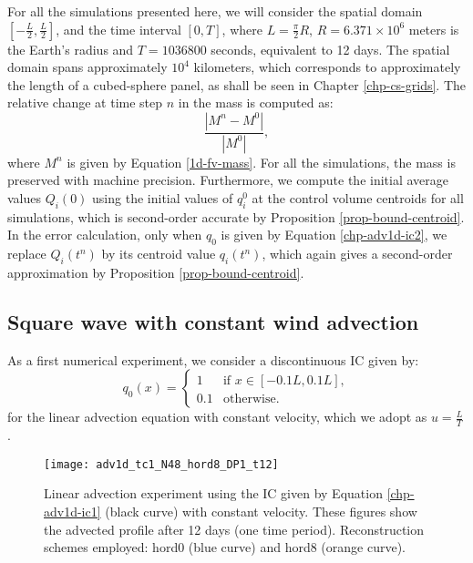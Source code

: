 For all the simulations presented here, we will consider the spatial domain $[-\frac{L}{2},\frac{L}{2}]$,
and the time interval $[0,T]$,  where $L = \frac{\pi}{2} R$, $R = 6.371 \times 10^{6}$ meters is the Earth's radius and
$T = 1036800$ seconds, equivalent to 12 days.
The spatial domain spans approximately $10^4$ kilometers, which corresponds to approximately the length of a cubed-sphere panel,
as shall be seen in Chapter \ref{chp-cs-grids}.
The relative change at time step $n$ in the mass is computed as:
\begin{equation*}
	\frac{|M^n-M^0|}{|M^0|},
\end{equation*}
where $M^n$ is given by Equation \eqref{1d-fv-mass}.
For all the simulations, the
mass is preserved with machine precision. Furthermore,
we compute the initial average values $Q_i(0)$ using
the initial values of $q^0_i$ at the control volume centroids for all simulations,
which is second-order accurate by Proposition \ref{prop-bound-centroid}. 
In the error calculation, only when $q_0$ is given by Equation \eqref{chp-adv1d-ic2},
we replace $Q_{i}(t^n)$ by its centroid value $q_{i}(t^n)$, which again gives
a second-order approximation by Proposition \ref{prop-bound-centroid}.

\subsection{Square wave with constant wind advection}
\label{chp-adv1d-sec-numerical-exp-1}
As a first numerical experiment, we consider
a discontinuous IC given by:
\begin{equation}
	\label{chp-adv1d-ic1}
		q_0(x) =  
  \begin{cases}
		1 & \text{if } x \in [-0.1L,0.1L],\\
		0.1 & \text{otherwise}.
  \end{cases}
\end{equation}
for the linear advection equation with constant velocity, which we adopt as $u=\frac{L}{T}$.
\begin{figure}[!htb]
	\centering
	\texttt{[image: adv1d\_tc1\_N48\_hord8\_DP1\_t12]}
	\caption{Linear advection experiment using the IC given by Equation \eqref{chp-adv1d-ic1} (black curve) with constant velocity.
		These figures show the advected profile after 12 days (one time period).
		Reconstruction schemes employed: hord0 (blue curve) and hord8 (orange curve).\label{chp-adv1d-sec-exp-adv1}}
\end{figure}

